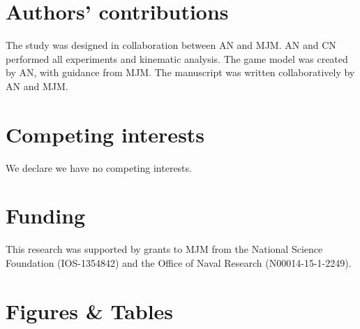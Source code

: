 \documentclass[]{rsos}%
\begin{document}
\section*{Authors' contributions}
The study was designed in collaboration between AN and MJM.
AN and CN performed all experiments and kinematic analysis.
The game model was created by AN, with guidance from MJM. 
The manuscript was written collaboratively by AN and MJM.

\section*{Competing interests}
We declare we have no competing interests.

\section*{Funding}

This research was supported by grants to MJM from the National Science Foundation (IOS-1354842) and the Office of Naval Research (N00014-15-1-2249).





\linespread{1}\selectfont %



\pagebreak



\section*{Figures \& Tables}

\linespread{1.3}\selectfont %
\end{document}
